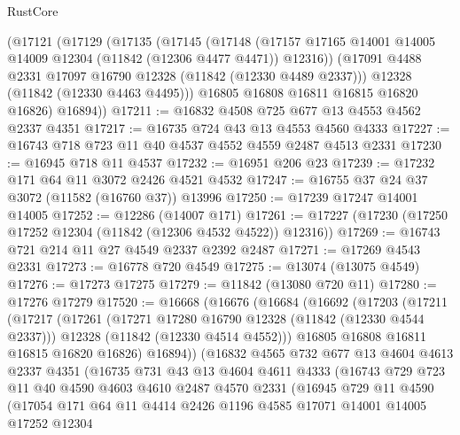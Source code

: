 \begin{lexlean}{RustCore}
\begin{coremodule}
    (@17121
      (@17129
        (@17135
          (@17145
            (@17148
              (@17157 @17165 @14001 @14005 @14009 @12304 (@11842 (@12306 @4477 @4471)) @12316))
            (@17091 @4488 @2331 @17097 @16790 @12328 (@11842 (@12330 @4489 @2337)))
            @12328
            (@11842 (@12330 @4463 @4495)))
          @16805
          @16808
          @16811
          @16815
          @16820
          @16826)
        @16894))
@17211 := @16832 @4508 @725 @677 @13 @4553 @4562 @2337 @4351
@17217 := @16735 @724 @43 @13 @4553 @4560 @4333
@17227 := @16743 @718 @723 @11 @40 @4537 @4552 @4559 @2487 @4513 @2331
@17230 := @16945 @718 @11 @4537
@17232 := @16951 @206 @23
@17239 := @17232 @171 @64 @11 @3072 @2426 @4521 @4532
@17247 := @16755 @37 @24 @37 @3072 (@11582 (@16760 @37)) @13996
@17250 := @17239 @17247 @14001 @14005
@17252 := @12286 (@14007 @171)
@17261 := @17227 (@17230 (@17250 @17252 @12304 (@11842 (@12306 @4532 @4522)) @12316))
@17269 := @16743 @721 @214 @11 @27 @4549 @2337 @2392 @2487
@17271 := @17269 @4543 @2331
@17273 := @16778 @720 @4549
@17275 := @13074 (@13075 @4549)
@17276 := @17273 @17275
@17279 := @11842 (@13080 @720 @11)
@17280 := @17276 @17279
@17520 := @16668
    (@16676
      (@16684
        (@16692
          (@17203
            (@17211
              (@17217
                (@17261
                  (@17271 @17280 @16790 @12328 (@11842 (@12330 @4544 @2337)))
                  @12328
                  (@11842 (@12330 @4514 @4552)))
                @16805
                @16808
                @16811
                @16815
                @16820
                @16826)
              @16894))
          (@16832
            @4565
            @732
            @677
            @13
            @4604
            @4613
            @2337
            @4351
            (@16735
              @731
              @43
              @13
              @4604
              @4611
              @4333
              (@16743
                @729
                @723
                @11
                @40
                @4590
                @4603
                @4610
                @2487
                @4570
                @2331
                (@16945
                  @729
                  @11
                  @4590
                  (@17054
                    @171
                    @64
                    @11
                    @4414
                    @2426
                    @1196
                    @4585
                    @17071
                    @14001
                    @14005
                    @17252
                    @12304

\end{coremodule}
\end{lexlean}
